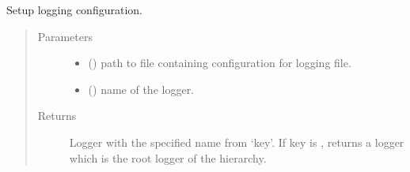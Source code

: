 \documentclass[letterpaper,10pt,english]{sphinxmanual}
\begin{document}
\begin{fulllineitems}
\label{\detokenize{_autosummary/graphdb_builder:graphdb_builder.builder_utils.setup_logging}}
Setup logging configuration.
\begin{quote}\begin{description}
\item[{Parameters}] \leavevmode\begin{itemize}
\item {} 
 () \textendash{} path to file containing configuration for logging file.

\item {} 
 () \textendash{} name of the logger.

\end{itemize}

\item[{Returns}] \leavevmode
Logger with the specified name from ‘key’. If key is , returns a logger which is                 the root logger of the hierarchy.

\end{description}\end{quote}

\end{fulllineitems}

\end{document}
